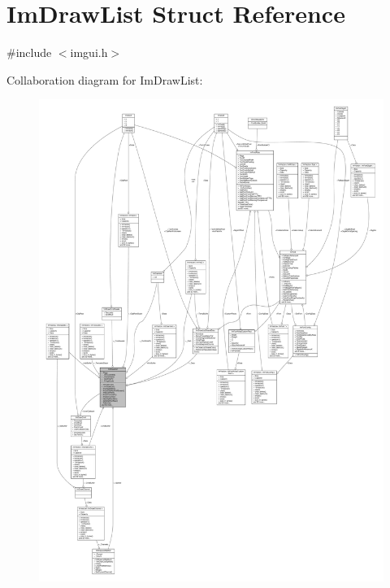 \hypertarget{structImDrawList}{}\section{Im\+Draw\+List Struct Reference}
\label{structImDrawList}


{\ttfamily \#include $<$imgui.\+h$>$}



Collaboration diagram for Im\+Draw\+List\+:
\nopagebreak
\begin{figure}[H]
\begin{center}
\leavevmode
\includegraphics[width=350pt]{structImDrawList__coll__graph}
\end{center}
\end{figure}
